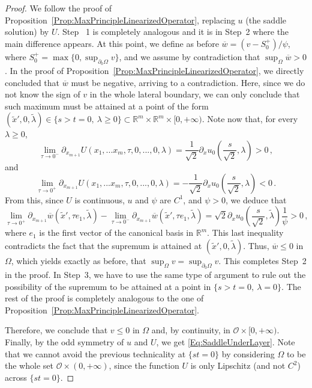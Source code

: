 \documentclass[12pt,reqno]{amsart}
\theoremstyle{definition}
\theoremstyle{remark}
\newcommand{\con}[1]{\mathbb{#1}}
\newcommand{\R}{\con{R}} %
\newcommand{\ocal}{\mathcal{O}}
\numberwithin{equation}{section}
\begin{document}
\begin{proof}
We follow the proof of Proposition~\ref{Prop:MaxPrincipleLinearizedOperator}, replacing $u$ (the saddle solution) by $U$. Step~ 1 is completely analogous and it is in Step~2 where the main difference appears. At this point, we define as before $\overline{w} = (v - S_0^+)/\psi$, where $S_0^+ = \max \{0, \sup_{\partial_0 \Omega} v\}$, and we assume by contradiction that $\sup_{\Omega} \overline{w}>0$. In the proof of Proposition~\ref{Prop:MaxPrincipleLinearizedOperator}, we directly concluded that $\overline{w}$ must be negative, arriving to a contradiction. Here, since we do not know the sign of $v$ in the whole lateral boundary, we can only conclude that such maximum must be attained at a point of the form $(\tilde{x}',0, \tilde{\lambda})\in \{s > t= 0,\ \lambda \geq 0\}\subset \R^m \times \R^m \times [0,+\infty)$. Note now that, for every $\lambda \geq 0$,
\begin{equation}
\label{Eq:ULipschitz1}
\lim_{\tau\to 0^-} \partial_{x_{m+1}}  U(x_1,...x_m,\tau,0,...,0,\lambda) = \frac{1}{\sqrt{2}}\partial_xu_0\left(\frac{s}{\sqrt{2}},\lambda\right)>0\,, 
\end{equation}
and
\begin{equation}
\label{Eq:ULipschitz2}
\lim_{\tau\to 0^+} \partial_{x_{m+1}} U(x_1,...x_m,\tau,0,...,0,\lambda) = -\frac{1}{\sqrt{2}}\partial_xu_0\left(\frac{s}{\sqrt{2}},\lambda\right) <0\,.
\end{equation}
From this, since $U$ is continuous, $u$ and $\psi$ are $C^1$, and $\psi > 0$, we deduce that
$$ \lim_{\tau\to 0^+} \partial_{x_{m+1}} \overline{w} (\tilde{x}',\tau e_1,\tilde{\lambda}) - \lim_{\tau \to 0^-} \partial_{x_{m+1}} \overline{w} (\tilde{x}',\tau e_1,\tilde{\lambda}) = \sqrt{2} \partial_xu_0\left(\frac{s}{\sqrt{2}},\tilde{\lambda} \right) \dfrac{1}{\psi}>0\,,  
$$
where $e_1$ is the first vector of the canonical basis in $\R^{m}$. This last inequality contradicts the fact that the supremum is attained at $(\tilde{x}',0, \tilde{\lambda})$. Thus, $\overline{w}\leq 0$ in $\Omega$, which yields exactly as before,  that $\sup _\Omega v = \sup_{\partial_0 \Omega} v$. This completes Step~2 in the proof. In Step~3, we have to use the same type of argument to rule out the possibility of the supremum to be attained at a point in $\{s > t = 0,\ \lambda = 0\}$. The rest of the proof is completely analogous to the one of Proposition~\ref{Prop:MaxPrincipleLinearizedOperator}.

Therefore, we conclude that $v\leq 0$ in $\Omega$ and, by continuity, in $\ocal\times[0,+\infty)$. Finally, by the odd symmetry of $u$ and $U$, we get \eqref{Eq:SaddleUnderLayer}. Note that we cannot avoid the previous technicality at $\{st=0\}$ by considering $\Omega$ to be the whole set $\ocal \times (0,+\infty)$, since the function $U$ is only Lipschitz (and not $C^2$) across $\{st=0\}$.
\end{proof}
\end{document}
